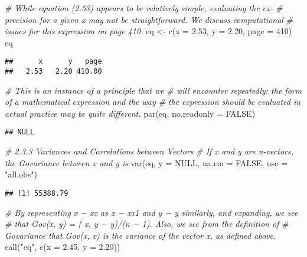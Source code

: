 \documentclass[
]{article}
\newenvironment{Shaded}{\begin{snugshade}}{\end{snugshade}}
\newcommand{\AttributeTok}[1]{\textcolor[rgb]{0.77,0.63,0.00}{#1}}
\newcommand{\CommentTok}[1]{\textcolor[rgb]{0.56,0.35,0.01}{\textit{#1}}}
\newcommand{\ConstantTok}[1]{\textcolor[rgb]{0.00,0.00,0.00}{#1}}
\newcommand{\DecValTok}[1]{\textcolor[rgb]{0.00,0.00,0.81}{#1}}
\newcommand{\FloatTok}[1]{\textcolor[rgb]{0.00,0.00,0.81}{#1}}
\newcommand{\FunctionTok}[1]{\textcolor[rgb]{0.00,0.00,0.00}{#1}}
\newcommand{\NormalTok}[1]{#1}
\newcommand{\OtherTok}[1]{\textcolor[rgb]{0.56,0.35,0.01}{#1}}
\newcommand{\StringTok}[1]{\textcolor[rgb]{0.31,0.60,0.02}{#1}}
\begin{document}
\begin{Shaded}
\begin{Highlighting}[]
\CommentTok{\# While equation (2.53) appears to be relatively simple, evaluating the ex{-}}
\CommentTok{\# precision for a given x may not be straightforward. We discuss computational}
\CommentTok{\# issues for this expression on page 410.}
\NormalTok{eq }\OtherTok{\textless{}{-}} \FunctionTok{c}\NormalTok{(}\AttributeTok{x =} \FloatTok{2.53}\NormalTok{, }\AttributeTok{y =} \FloatTok{2.20}\NormalTok{, }\AttributeTok{page =} \DecValTok{410}\NormalTok{)}
\NormalTok{eq}
\end{Highlighting}
\end{Shaded}

\begin{verbatim}
##      x      y   page 
##   2.53   2.20 410.00
\end{verbatim}

\begin{Shaded}
\begin{Highlighting}[]
\CommentTok{\# This is an instance of a principle that we}
\CommentTok{\# will encounter repeatedly: the form of a mathematical expression and the way}
\CommentTok{\# the expression should be evaluated in actual practice may be quite different.}
\FunctionTok{par}\NormalTok{(eq, }\AttributeTok{no.readonly =} \ConstantTok{FALSE}\NormalTok{)}
\end{Highlighting}
\end{Shaded}

\begin{verbatim}
## NULL
\end{verbatim}

\begin{Shaded}
\begin{Highlighting}[]
\CommentTok{\# 2.3.3 Variances and Correlations between Vectors}
\CommentTok{\# If x and y are n{-}vectors, the Govariance between x and y is}
\FunctionTok{var}\NormalTok{(eq, }\AttributeTok{y =} \ConstantTok{NULL}\NormalTok{, }\AttributeTok{na.rm =} \ConstantTok{FALSE}\NormalTok{, }\AttributeTok{use =} \StringTok{"all.obs"}\NormalTok{)}
\end{Highlighting}
\end{Shaded}

\begin{verbatim}
## [1] 55388.79
\end{verbatim}

\begin{Shaded}
\begin{Highlighting}[]
\CommentTok{\# By representing x − xx as x − xx1 and y − y similarly, and expanding, we see}
\CommentTok{\# that Gov(x, y) = ( x, y − y)/(n − 1). Also, we see from the definition of}
\CommentTok{\# Govariance that Gov(x, x) is the variance of the vector x, as defined above.}
\FunctionTok{call}\NormalTok{(}\StringTok{"eq"}\NormalTok{, }\FunctionTok{c}\NormalTok{(}\AttributeTok{x =} \FloatTok{2.45}\NormalTok{, }\AttributeTok{y =} \FloatTok{2.20}\NormalTok{))}
\end{Highlighting}
\end{Shaded}
\end{document}
